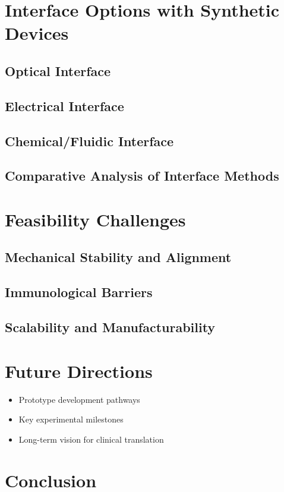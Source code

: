 \documentclass[12pt]{article}
\begin{document}
	\section{Interface Options with Synthetic Devices}
	\subsection{Optical Interface}
	\subsection{Electrical Interface}
	\subsection{Chemical/Fluidic Interface}
	\subsection{Comparative Analysis of Interface Methods}
	
	\section{Feasibility Challenges}
	\subsection{Mechanical Stability and Alignment}
	\subsection{Immunological Barriers}
	\subsection{Scalability and Manufacturability}
	
	\section{Future Directions}
	\begin{itemize}
		\item Prototype development pathways
		\item Key experimental milestones
		\item Long-term vision for clinical translation
	\end{itemize}
	
	\section{Conclusion}
	
	
	
	
	
	
\end{document}
